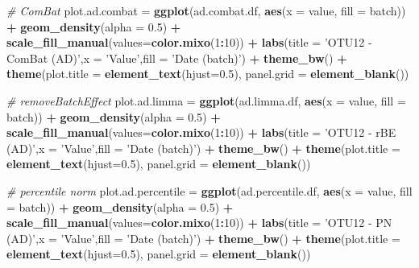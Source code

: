 \documentclass[]{book}
\newenvironment{Shaded}{\begin{snugshade}}{\end{snugshade}}
\newcommand{\KeywordTok}[1]{\textcolor[rgb]{0.13,0.29,0.53}{\textbf{#1}}}
\newcommand{\DataTypeTok}[1]{\textcolor[rgb]{0.13,0.29,0.53}{#1}}
\newcommand{\DecValTok}[1]{\textcolor[rgb]{0.00,0.00,0.81}{#1}}
\newcommand{\FloatTok}[1]{\textcolor[rgb]{0.00,0.00,0.81}{#1}}
\newcommand{\StringTok}[1]{\textcolor[rgb]{0.31,0.60,0.02}{#1}}
\newcommand{\CommentTok}[1]{\textcolor[rgb]{0.56,0.35,0.01}{\textit{#1}}}
\newcommand{\OperatorTok}[1]{\textcolor[rgb]{0.81,0.36,0.00}{\textbf{#1}}}
\newcommand{\NormalTok}[1]{#1}
\begin{document}
\begin{Shaded}
\begin{Highlighting}[]
\CommentTok{# ComBat}
\NormalTok{plot.ad.combat =}\StringTok{ }\KeywordTok{ggplot}\NormalTok{(ad.combat.df, }\KeywordTok{aes}\NormalTok{(}\DataTypeTok{x =}\NormalTok{ value, }\DataTypeTok{fill =}\NormalTok{ batch)) }\OperatorTok{+}\StringTok{ }\KeywordTok{geom_density}\NormalTok{(}\DataTypeTok{alpha =} \FloatTok{0.5}\NormalTok{) }\OperatorTok{+}\StringTok{ }\KeywordTok{scale_fill_manual}\NormalTok{(}\DataTypeTok{values=}\KeywordTok{color.mixo}\NormalTok{(}\DecValTok{1}\OperatorTok{:}\DecValTok{10}\NormalTok{)) }\OperatorTok{+}\StringTok{ }\KeywordTok{labs}\NormalTok{(}\DataTypeTok{title =} \StringTok{'OTU12 - ComBat (AD)'}\NormalTok{,}\DataTypeTok{x =} \StringTok{'Value'}\NormalTok{,}\DataTypeTok{fill =} \StringTok{'Date (batch)'}\NormalTok{) }\OperatorTok{+}\StringTok{ }\KeywordTok{theme_bw}\NormalTok{() }\OperatorTok{+}\StringTok{ }\KeywordTok{theme}\NormalTok{(}\DataTypeTok{plot.title =} \KeywordTok{element_text}\NormalTok{(}\DataTypeTok{hjust=}\FloatTok{0.5}\NormalTok{), }\DataTypeTok{panel.grid =} \KeywordTok{element_blank}\NormalTok{())}


\CommentTok{# removeBatchEffect}
\NormalTok{plot.ad.limma =}\StringTok{ }\KeywordTok{ggplot}\NormalTok{(ad.limma.df, }\KeywordTok{aes}\NormalTok{(}\DataTypeTok{x =}\NormalTok{ value, }\DataTypeTok{fill =}\NormalTok{ batch)) }\OperatorTok{+}\StringTok{ }\KeywordTok{geom_density}\NormalTok{(}\DataTypeTok{alpha =} \FloatTok{0.5}\NormalTok{) }\OperatorTok{+}\StringTok{ }\KeywordTok{scale_fill_manual}\NormalTok{(}\DataTypeTok{values=}\KeywordTok{color.mixo}\NormalTok{(}\DecValTok{1}\OperatorTok{:}\DecValTok{10}\NormalTok{)) }\OperatorTok{+}\StringTok{ }\KeywordTok{labs}\NormalTok{(}\DataTypeTok{title =} \StringTok{'OTU12 - rBE (AD)'}\NormalTok{,}\DataTypeTok{x =} \StringTok{'Value'}\NormalTok{,}\DataTypeTok{fill =} \StringTok{'Date (batch)'}\NormalTok{) }\OperatorTok{+}\StringTok{ }\KeywordTok{theme_bw}\NormalTok{() }\OperatorTok{+}\StringTok{ }\KeywordTok{theme}\NormalTok{(}\DataTypeTok{plot.title =} \KeywordTok{element_text}\NormalTok{(}\DataTypeTok{hjust=}\FloatTok{0.5}\NormalTok{), }\DataTypeTok{panel.grid =} \KeywordTok{element_blank}\NormalTok{())}


\CommentTok{# percentile norm}
\NormalTok{plot.ad.percentile =}\StringTok{ }\KeywordTok{ggplot}\NormalTok{(ad.percentile.df, }\KeywordTok{aes}\NormalTok{(}\DataTypeTok{x =}\NormalTok{ value, }\DataTypeTok{fill =}\NormalTok{ batch)) }\OperatorTok{+}\StringTok{ }\KeywordTok{geom_density}\NormalTok{(}\DataTypeTok{alpha =} \FloatTok{0.5}\NormalTok{) }\OperatorTok{+}\StringTok{ }\KeywordTok{scale_fill_manual}\NormalTok{(}\DataTypeTok{values=}\KeywordTok{color.mixo}\NormalTok{(}\DecValTok{1}\OperatorTok{:}\DecValTok{10}\NormalTok{)) }\OperatorTok{+}\StringTok{ }\KeywordTok{labs}\NormalTok{(}\DataTypeTok{title =} \StringTok{'OTU12 - PN (AD)'}\NormalTok{,}\DataTypeTok{x =} \StringTok{'Value'}\NormalTok{,}\DataTypeTok{fill =} \StringTok{'Date (batch)'}\NormalTok{) }\OperatorTok{+}\StringTok{ }\KeywordTok{theme_bw}\NormalTok{() }\OperatorTok{+}\StringTok{ }\KeywordTok{theme}\NormalTok{(}\DataTypeTok{plot.title =} \KeywordTok{element_text}\NormalTok{(}\DataTypeTok{hjust=}\FloatTok{0.5}\NormalTok{), }\DataTypeTok{panel.grid =} \KeywordTok{element_blank}\NormalTok{())}



\end{Highlighting}
\end{Shaded}
\end{document}
